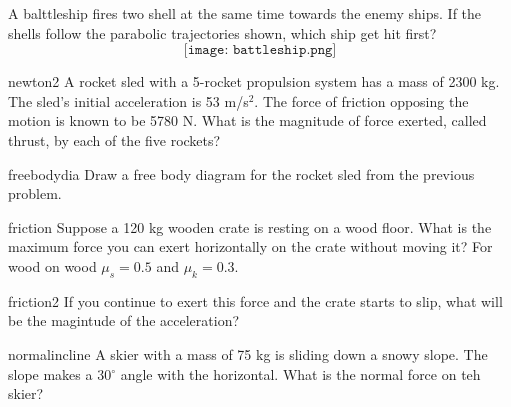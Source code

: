 \documentclass[letterpaper]{article}
\begin{document}
{\begin{question}{ }
A balttleship fires two shell at the same time towards the enemy ships. If the 
shells follow the parabolic trajectories shown, which ship get hit first?
\[\texttt{[image: battleship.png]}\]
\begin{choices}
\end{choices}
\end{question}

\begin{question}{newton2}
A rocket sled with a 5-rocket propulsion system has a mass of 2300 kg. The 
sled's initial acceleration is 53 m/s$^2$. The force of friction opposing 
the motion is known to be 5780 N. What is the magnitude of force exerted, 
called thrust, by each of the five rockets?  
\begin{choices}
\end{choices}
\end{question}
\begin{question}{freebodydia}
Draw a free body diagram for the rocket sled from the previous problem.
\end{question}



\begin{question}{friction}
Suppose a 120 kg wooden crate is resting on a wood floor.
What is the maximum force you can exert horizontally on the crate 
without moving it? For wood on wood $\mu_s=0.5$ and $\mu_k=0.3$.
\end{question}

\begin{question}{friction2}
If you continue to exert this force and the crate starts to slip, what 
will be the magintude of the acceleration? 
\begin{choices}
\end{choices}
\end{question}

\begin{question}{normalincline}
A skier with a mass of 75 kg is sliding down a snowy slope. The slope makes a 
30$^\circ$ angle with the horizontal.  What is the normal force on teh skier?
\end{question}
 

\cleardoublepage

~
}
\end{document}
